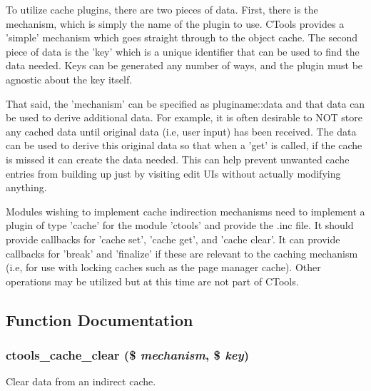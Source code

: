 To utilize cache plugins, there are two pieces of data. First, there is the mechanism, which is simply the name of the plugin to use. CTools provides a 'simple' mechanism which goes straight through to the object cache. The second piece of data is the 'key' which is a unique identifier that can be used to find the data needed. Keys can be generated any number of ways, and the plugin must be agnostic about the key itself.

That said, the 'mechanism' can be specified as pluginame::data and that data can be used to derive additional data. For example, it is often desirable to NOT store any cached data until original data (i.e, user input) has been received. The data can be used to derive this original data so that when a 'get' is called, if the cache is missed it can create the data needed. This can help prevent unwanted cache entries from building up just by visiting edit UIs without actually modifying anything.

Modules wishing to implement cache indirection mechanisms need to implement a plugin of type 'cache' for the module 'ctools' and provide the .inc file. It should provide callbacks for 'cache set', 'cache get', and 'cache clear'. It can provide callbacks for 'break' and 'finalize' if these are relevant to the caching mechanism (i.e, for use with locking caches such as the page manager cache). Other operations may be utilized but at this time are not part of CTools. 

\subsection{Function Documentation}
\hypertarget{ctools_2includes_2cache_8inc_a101263b0d8cf633a221db17bff52e47b}{
\subsubsection[{ctools\_\-cache\_\-clear}]{\setlength{\rightskip}{0pt plus 5cm}ctools\_\-cache\_\-clear (\$ {\em mechanism}, \/  \$ {\em key})}}
\label{ctools_2includes_2cache_8inc_a101263b0d8cf633a221db17bff52e47b}
Clear data from an indirect cache.


